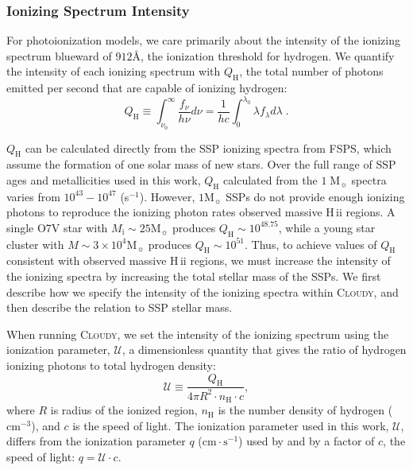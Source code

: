 \documentclass[linenumbers, tighten, trackchanges]{aastex61}%
\newcommand{\FSPS}{{\sc FSPS}\xspace}
\newcommand{\Cloudy}{\textsc{Cloudy}\xspace}
\newcommand\Msun{\ensuremath{\mathrm{M_{\sun}}}}
\newcommand{\hii}{H\,{\sc ii}\xspace}
\newcommand{\nH}{\ensuremath{n_{\mathrm{H}}}}
\newcommand{\cm}[1]{\ensuremath{\mathrm{cm}^{#1}}}
\newcommand{\ang}{\ensuremath{\mbox{\AA}}}
\newcommand{\QH}{\ensuremath{Q_{\mathrm{H}}}}
\newcommand{\Up}{\ensuremath{\mathcal{U}}}
\newcommand\cms{\ensuremath{\mathrm{cm} \cdot \mathrm{s}^{-1}}}
\begin{document}
\subsubsection{Ionizing Spectrum Intensity}\label{sec:methods:cloudy:intensity}

For photoionization models, we care primarily about the intensity of the ionizing spectrum blueward of $912 \ang$, the ionization threshold for hydrogen. We quantify the intensity of each ionizing spectrum with \QH{}, the total number of photons emitted per second that are capable of ionizing hydrogen:
\begin{equation}\label{eq:Q}
    \QH{} \equiv \int_{\nu_0}^{\infty}\frac{f_{\nu}}{h \nu} d\nu = \frac{1}{hc} \int_0^{\lambda_0}\lambda f_{\lambda}d\lambda\;.
\end{equation}

\QH{} can be calculated directly from the SSP ionizing spectra from \FSPS, which assume the formation of one solar mass of new stars. Over the full range of SSP ages and metallicities used in this work, \QH{} calculated from the $1\;\Msun{}$ spectra varies from $10^{43} - 10^{47}$ (s$^{-1}$). However, $1\Msun$ SSPs do not provide enough ionizing photons to reproduce the ionizing photon rates observed massive \hii regions. A single O7V star with $M_{\mathrm{i}} \sim 25 \Msun$ produces $\QH \sim 10^{48.75}$, while a young star cluster with $M \sim 3 \times 10^4 \Msun$ produces $\QH{} \sim 10^{51}$. Thus, to achieve values of \QH{} consistent with observed massive \hii regions, we must increase the intensity of the ionizing spectra by increasing the total stellar mass of the SSPs. We first describe how we specify the intensity of the ionizing spectra within \Cloudy, and then describe the relation to SSP stellar mass.

When running \Cloudy, we set the intensity of the ionizing spectrum using the ionization parameter, $\Up$, a dimensionless quantity that gives the ratio of hydrogen ionizing photons to total hydrogen density:
\begin{equation}\label{eq:logU}
    \Up \equiv \frac{\QH{}}{4 \pi R^2 \cdot \nH \cdot c},
\end{equation}
where $R$ is radius of the ionized region, \nH{} is the number density of hydrogen (\cm{-3}), and $c$ is the speed of light. The ionization parameter used in this work, \Up{}, differs from the ionization parameter $q$ (\cms) used by \citet{Levesque10} and \citet{Dopita13} by a factor of $c$, the speed of light: $q = \Up \cdot c$.
\end{document}
